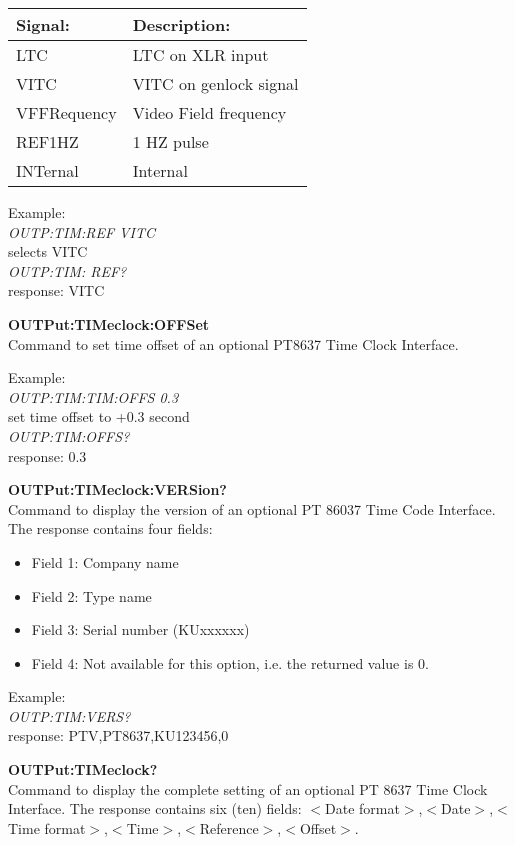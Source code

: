 \begin{tabular}{|l|l|}
\hline
Signal:		& Description: \\ \hline
LTC				& LTC on XLR input\\ \hline
VITC			& VITC on genlock signal\\ \hline
VFFRequency	& Video Field frequency\\ \hline
REF1HZ		& 1 HZ pulse\\ \hline
INTernal	& Internal\\ \hline
\end{tabular}

Example:\\
\textit{OUTP:TIM:REF VITC}\\
selects VITC\\
\textit{OUTP:TIM: REF?}\\
response: VITC

\textbf{OUTPut:TIMeclock:OFFSet}\\
Command to set time offset of an optional PT8637 Time Clock Interface. 

Example:\\
\textit{OUTP:TIM:TIM:OFFS 0.3}\\
set time offset to +0.3 second\\
\textit{OUTP:TIM:OFFS?}\\
response: 0.3

\textbf{OUTPut:TIMeclock:VERSion?}\\
Command to display the version of an optional PT 86037 Time Code Interface. The response contains four fields:
\begin{itemize}
\item Field 1: Company name
\item Field 2: Type name
\item Field 3: Serial number (KUxxxxxx)
\item Field 4: Not available for this option, i.e. the returned value is 0.
\end{itemize}

Example:\\
\textit{OUTP:TIM:VERS?}\\
response: PTV,PT8637,KU123456,0

\textbf{OUTPut:TIMeclock?}\\
Command to display the complete setting of an optional PT 8637 Time Clock Interface. The response contains six (ten) fields:
$<$Date format$>$,$<$Date$>$,$<$Time format$>$,$<$Time$>$,$<$Reference$>$,$<$Offset$>$. 


